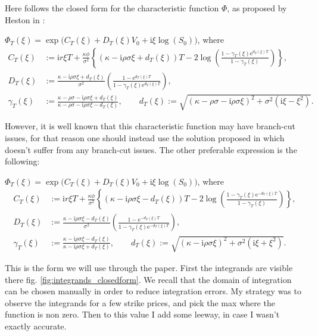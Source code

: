 Here follows the closed form for the characteristic function $\Phi$, as proposed by Heston in \cite{Heston}:



$\Phi_T(\xi) = \exp\Big(C_T(\xi) + D_T(\xi)V_0 + \mathrm{i}\xi \log(S_0)\Big)$, where
\begin{align*}
C_T(\xi) & := \mathrm{i}r\xi T + \frac{\kappa \phi }{\sigma^2}\left\{\left(\kappa-\mathrm{i}\rho\sigma\xi+d_T(\xi)\right)T
- 2\log\left(\frac{1-\gamma_T(\xi)\mathrm{e}^{d_T(\xi)T}}{1-\gamma_T(\xi)}\right)\right\},\\
D_T(\xi) & := \frac{\kappa - \mathrm{i}\rho\sigma\xi + d_T(\xi)}{\sigma^2}
\left(\frac{1-\mathrm{e}^{d_T(\xi)T}}{1-\gamma_T(\xi)\mathrm{e}^{d_T(\xi)T}}\right),\\
\gamma_T(\xi) & := \frac{\kappa-\rho\sigma - \mathrm{i}\rho\sigma\xi + d_T(\xi)}
{\kappa-\rho\sigma - \mathrm{i}\rho\sigma\xi - d_T(\xi)},
\qquad 
d_T(\xi) := \sqrt{(\kappa-\rho\sigma-\mathrm{i}\rho\sigma\xi)^2 + \sigma^2(\mathrm{i}\xi - \xi^2)}.
\end{align*}

However, it is well known that this characteristic function may have branch-cut issues, for that reason one should instead use the solution proposed in \cite{gatheral} which doesn't suffer from any branch-cut issues. The other preferable expression is the following:


$\Phi_T(\xi) = \exp\Big(C_T(\xi) + D_T(\xi)V_0 + \mathrm{i}\xi \log(S_0)\Big)$, where
\begin{align*}
C_T(\xi) & := \mathrm{i}r\xi T + \frac{\kappa\phi}{\sigma^2}\left\{\left(\kappa-\mathrm{i}\rho\sigma\xi-d_T(\xi)\right)T
- 2\log\left(\frac{1-\gamma_T(\xi)\mathrm{e}^{-d_T(\xi)T}}{1-\gamma_T(\xi)}\right)\right\},\\
D_T(\xi) & := \frac{\kappa - \mathrm{i}\rho\sigma\xi - d_T(\xi)}{\sigma^2}
\left(\frac{1-\mathrm{e}^{-d_T(\xi)T}}{1-\gamma_T(\xi)\mathrm{e}^{-d_T(\xi)T}}\right),\\
\gamma_T(\xi) & := \frac{\kappa - \mathrm{i}\rho\sigma\xi - d_T(\xi)}{\kappa - \mathrm{i}\rho\sigma\xi + d_T(\xi)},
\qquad 
d_T(\xi) := \sqrt{(\kappa-\mathrm{i}\rho\sigma\xi)^2 + \sigma^2(\mathrm{i}\xi+\xi^2)}.
\end{align*}

This is the form we will use through the paper. First the integrands are visible there fig. \ref{fig:integrands_closedform}. We recall that the domain of integration can be chosen manually in order to reduce integration errors. My strategy was to observe the integrands for a few strike prices, and pick the max where the function is non zero. Then to this value I add some leeway, in case I wasn't exactly accurate.

